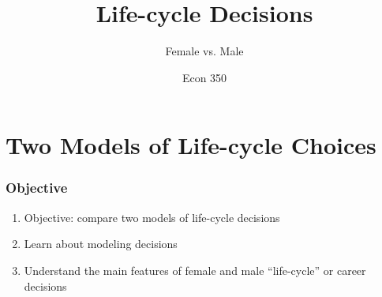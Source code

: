 

\title{Life-cycle Decisions}
\subtitle{Female vs. Male}
\author{Econ 350}





\begin{frame}[plain]
	\titlepage
\end{frame}



\section{Two Models of Life-cycle Choices}

\begin{frame}
	\frametitle{Objective}
		\begin{enumerate}
 			\item Objective: compare two models of life-cycle decisions
 			\item Learn about modeling decisions
 			\item Understand the main features of female and male ``life-cycle'' or career decisions
 		\end{enumerate}
\end{frame}

